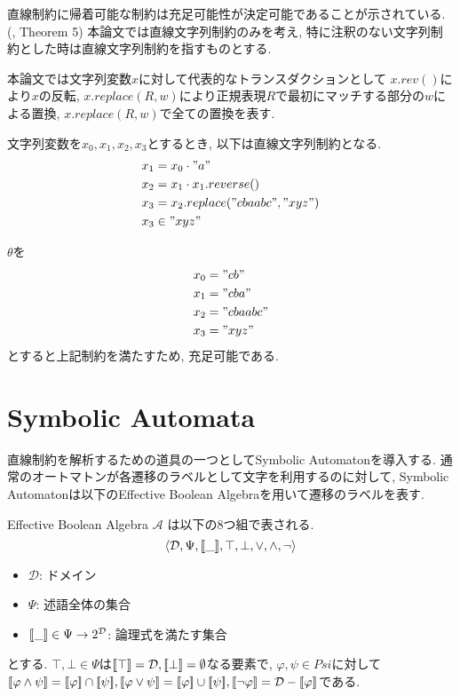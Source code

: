 \documentclass[uplatex,dvipdfmx,a4j]{jsreport}
\begin{document}
  直線制約に帰着可能な制約は充足可能性が決定可能であることが示されている.
  (\cite{lin2016string}, Theorem 5)
  本論文では直線文字列制約のみを考え, 特に注釈のない文字列制約とした時は直線文字列制約を指すものとする.

  \begin{example}
    本論文では文字列変数$x$に対して代表的なトランスダクションとして
    $x.rev()$により$x$の反転, $x.replace(R, w)$により正規表現$R$で最初にマッチする部分の$w$による置換,
    $x.replace(R, w)$で全ての置換を表す.

    文字列変数を$x_0, x_1, x_2, x_3$とするとき, 以下は直線文字列制約となる.
    \begin{align*}
      x_1 &= x_0 \cdot "a"  \\
      x_2 &= x_1 \cdot x_1.reverse()  \\
      x_3 &= x_2.replace("cbaabc", "xyz") \\
      x_3 &\in "xyz"
    \end{align*}

    $\theta$を
    \begin{align*}
      x_0 &= "cb" \\
      x_1 &= "cba"  \\
      x_2 &= "cbaabc" \\
      x_3 &= "xyz"
    \end{align*}
    とすると上記制約を満たすため, 充足可能である.
  \end{example}

  \section{Symbolic Automata}

  直線制約を解析するための道具の一つとしてSymbolic Automatonを導入する.
  通常のオートマトンが各遷移のラベルとして文字を利用するのに対して,
  Symbolic Automatonは以下のEffective Boolean Algebraを用いて遷移のラベルを表す.

  \begin{definition}
    Effective Boolean Algebra $\mathcal{A}$ は以下の8つ組で表される.
    \[
      {\langle {\mathcal{D}, \Psi,  {[ \! [{\_}] \! ]} , \top, \bot, \lor, \land, \lnot} \rangle}
    \]
    \begin{itemize}
      \item $\mathcal{D}$: ドメイン
      \item $\Psi$: 述語全体の集合
      \item ${[ \! [{\_}] \! ]} \in \Psi \rightarrow 2^{\mathcal{D}}$: 論理式を満たす集合
    \end{itemize}
    とする.
    $\top, \bot \in \Psi$は${[ \! [{\top}] \! ]} = \mathcal{D}, {[ \! [{\bot}] \! ]} = \emptyset$なる要素で,
    $\varphi, \psi \in Psi$に対して
    $\seman{\varphi \land \psi} = \seman{\varphi} \cap \seman{\psi},
    \seman{\varphi \lor \psi} = \seman{\varphi} \cup \seman{\psi},
    \seman{\lnot \varphi} = \mathcal{D} - \seman{\varphi}$である.
  \end{definition}
\end{document}
